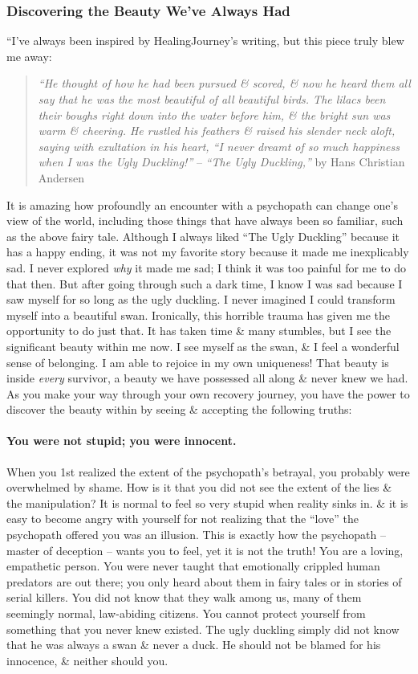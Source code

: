 \documentclass{article}
\numberwithin{equation}{section}
\begin{document}
\subsubsection{Discovering the Beauty We've Always Had}
``I've always been inspired by HealingJourney's writing, but this piece truly blew me away:
\begin{quotation}
	\textit{``He thought of how he had been pursued \& scored, \& now he heard them all say that he was the most beautiful of all beautiful birds. The lilacs been their boughs right down into the water before him, \& the bright sun was warm \& cheering. He rustled his feathers \& raised his slender neck aloft, saying with exultation in his heart, ``I never dreamt of so much happiness when I was the Ugly Duckling!''} -- \textit{``The Ugly Duckling,''} by Hans Christian Andersen
\end{quotation}
It is amazing how profoundly an encounter with a psychopath can change one's view of the world, including those things that have always been so familiar, such as the above fairy tale. Although I always liked ``The Ugly Duckling'' because it has a happy ending, it was not my favorite story because it made me inexplicably sad. I never explored \textit{why} it made me sad; I think it was too painful for me to do that then. But after going through such a dark time, I know I was sad because I saw myself for so long as the ugly duckling. I never imagined I could transform myself into a beautiful swan. Ironically, this horrible trauma has given me the opportunity to do just that. It has taken time \& many stumbles, but I see the significant beauty within me now. I see myself as the swan, \& I feel a wonderful sense of belonging. I am able to rejoice in my own uniqueness! That beauty is inside \textit{every} survivor, a beauty we have possessed all along \& never knew we had. As you make your way through your own recovery journey, you have the power to discover the beauty within by seeing \& accepting the following truths:


\paragraph{You were not stupid; you were innocent.} When you 1st realized the extent of the psychopath's betrayal, you probably were overwhelmed by shame. How is it that you did not see the extent of the lies \& the manipulation? It is normal to feel so very stupid when reality sinks in. \& it is easy to become angry with yourself for not realizing that the ``love'' the psychopath offered you was an illusion. This is exactly how the psychopath -- master of deception -- wants you to feel, yet it is not the truth! You are a loving, empathetic person. You were never taught that emotionally crippled human predators are out there; you only heard about them in fairy tales or in stories of serial killers. You did not know that they walk among us, many of them seemingly normal, law-abiding citizens. You cannot protect yourself from something that you never knew existed. The ugly duckling simply did not know that he was always a swan \& never a duck. He should not be blamed for his innocence, \& neither should you.
\end{document}

